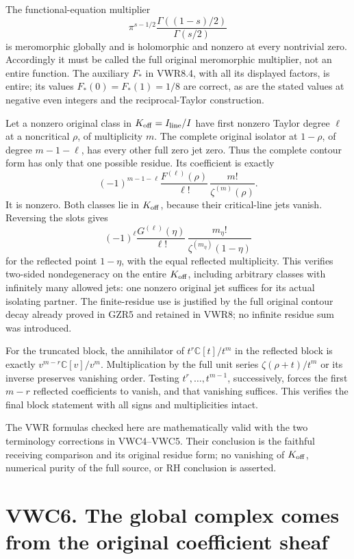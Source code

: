 The functional-equation multiplier \[
\pi^{s-1/2}\frac{\Gamma((1-s)/2)}{\Gamma(s/2)}
\] is meromorphic globally and is holomorphic and nonzero at every
nontrivial zero. Accordingly it must be called the full original
meromorphic multiplier, not an entire function. The auxiliary \(F_*\) in
VWR8.4, with all its displayed factors, is entire; its values
\(F_*(0)=F_*(1)=1/8\) are correct, as are the stated values at negative
even integers and the reciprocal-Taylor construction.

Let a nonzero original class in \(K_{\rm off}=I_{\rm line}/I\) have
first nonzero Taylor degree \(\ell\) at a noncritical \(\rho\), of
multiplicity \(m\). The complete original isolator at \(1-\rho\), of
degree \(m-1-\ell\), has every other full zero jet zero. Thus the
complete contour form has only that one possible residue. Its
coefficient is exactly \[
(-1)^{m-1-\ell}
\frac{F^{(\ell)}(\rho)}{\ell!}\,
\frac{m!}{\zeta^{(m)}(\rho)}.
\] It is nonzero. Both classes lie in \(K_{\rm off}\), because their
critical-line jets vanish. Reversing the slots gives \[
(-1)^\ell\frac{G^{(\ell)}(\eta)}{\ell!}\,
\frac{m_\eta!}{\zeta^{(m_\eta)}(1-\eta)}
\] for the reflected point \(1-\eta\), with the equal reflected
multiplicity. This verifies two-sided nondegeneracy on the entire
\(K_{\rm off}\), including arbitrary classes with infinitely many
allowed jets: one nonzero original jet suffices for its actual isolating
partner. The finite-residue use is justified by the full original
contour decay already proved in GZR5 and retained in VWR8; no infinite
residue sum was introduced.

For the truncated block, the annihilator of \(t^r\mathbb C[t]/t^m\) in
the reflected block is exactly \(v^{m-r}\mathbb C[v]/v^m\).
Multiplication by the full unit series \(\zeta(\rho+t)/t^m\) or its
inverse preserves vanishing order. Testing \(t^r,\ldots,t^{m-1}\),
successively, forces the first \(m-r\) reflected coefficients to vanish,
and that vanishing suffices. This verifies the final block statement
with all signs and multiplicities intact.

The VWR formulas checked here are mathematically valid with the two
terminology corrections in VWC4--VWC5. Their conclusion is the faithful
receiving comparison and its original residue form; no vanishing of
\(K_{\rm off}\), numerical purity of the full source, or RH conclusion
is asserted.

\section{VWC6. The global complex comes from the original coefficient
sheaf}\label{vwc6.-the-global-complex-comes-from-the-original-coefficient-sheaf}

